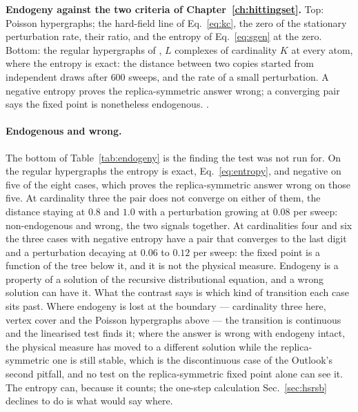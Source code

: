 \begin{table}[tb]
\centering\small
\begin{adjustbox}{max width=\linewidth}

\end{adjustbox}
\caption{\textbf{Endogeny against the two criteria of
Chapter~\ref{ch:hittingset}.} Top: Poisson hypergraphs; the hard-field line
of Eq.~\eqref{eq:kc}, the zero of the stationary perturbation rate, their
ratio, and the entropy of Eq.~\eqref{eq:sgen} at the zero. Bottom: the
regular hypergraphs of \citet{mezard2007}, $L$ complexes of cardinality $K$
at every atom, where the entropy is exact: the distance between two copies
started from independent draws after $600$ sweeps, and the rate of a small
perturbation. A negative entropy proves the replica-symmetric answer wrong;
a converging pair says the fixed point is nonetheless endogenous.
.}
\label{tab:endogeny}
\end{table}

\paragraph{Endogenous and wrong.} The bottom of Table~\ref{tab:endogeny}
is the finding the test was not run for. On the regular hypergraphs the
entropy is exact, Eq.~\eqref{eq:entropy}, and negative on five of the eight
cases, which proves the replica-symmetric answer wrong on those five. At
cardinality three the pair does not converge on either of them, the
distance staying at $0.8$ and $1.0$ with a perturbation growing at
$0.08$ per sweep: non-endogenous and wrong, the two signals together. At
cardinalities four and six the three cases with negative entropy have a
pair that converges to the last digit and a perturbation decaying at
$0.06$ to $0.12$ per sweep: the fixed point is a function of the tree
below it, and it is not the physical measure. Endogeny is a property of a
solution of the recursive distributional equation, and a wrong solution
can have it. What the contrast says is which kind of transition each case
sits past. Where endogeny is lost at the boundary --- cardinality three
here, vertex cover and the Poisson hypergraphs above --- the transition
is continuous and the linearised test finds it; where the answer is wrong
with endogeny intact, the physical measure has moved to a different
solution while the replica-symmetric one is still stable, which is the
discontinuous case of the Outlook's second pitfall, and no test on the
replica-symmetric fixed point alone can see it. The entropy can, because
it counts; the one-step calculation Sec.~\ref{sec:hsrsb} declines to do is
what would say where.

